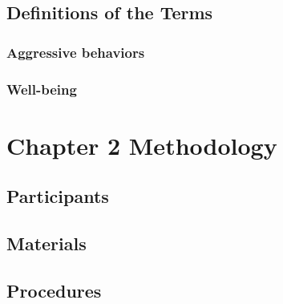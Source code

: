 \documentclass[a4paper, 12pt, twoside]{article}
\begin{document}
\subsection{\bf \normalsize{Definitions of the Terms}}
\subsubsection{\bf \normalsize{Aggressive behaviors}}
\lipsum[3]
\subsubsection{\bf \normalsize{Well-being}}
\lipsum[1]

\section*{\centering \bf \normalsize{Chapter 2 Methodology}}
\label{sec:met}
\lipsum[2]
\setcounter{section}{2}
\setcounter{subsection}{0}
\subsection{\bf \normalsize{Participants}}
\lipsum[3]
\subsection{\bf \normalsize{Materials}}
\lipsum[1]
\subsection{\bf \normalsize{Procedures}}
\lipsum[3]
\end{document}
